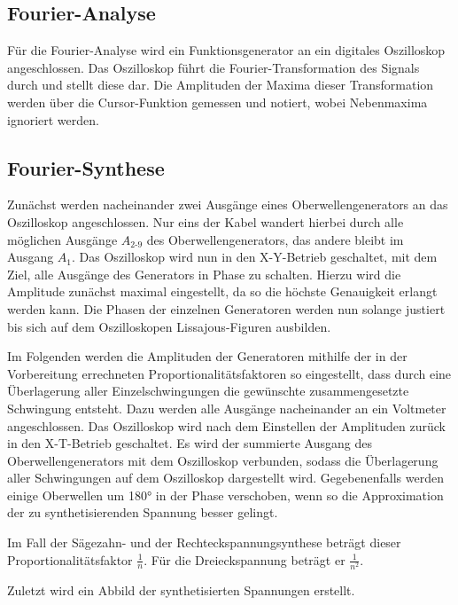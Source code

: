 \subsection{Fourier-Analyse}
Für die Fourier-Analyse wird ein Funktionsgenerator an ein digitales Oszilloskop angeschlossen.
Das Oszilloskop führt die Fourier-Transformation des Signals durch und stellt diese dar.
Die Amplituden der Maxima dieser Transformation werden über die Cursor-Funktion gemessen
und notiert, wobei Nebenmaxima ignoriert werden.

\subsection{Fourier-Synthese}
Zunächst werden nacheinander zwei Ausgänge eines Oberwellengenerators an das Oszilloskop angeschlossen.
Nur eins der Kabel wandert hierbei durch alle möglichen Ausgänge $A_\text{2-9}$ des Oberwellengenerators, das andere bleibt
im Ausgang $A_\text{1}$. Das Oszilloskop wird nun in den X-Y-Betrieb geschaltet, mit dem Ziel,
alle Ausgänge des Generators in Phase zu schalten. Hierzu wird die Amplitude zunächst maximal eingestellt,
da so die höchste Genauigkeit erlangt werden kann. Die Phasen der einzelnen Generatoren werden
nun solange justiert bis sich auf dem Oszilloskopen Lissajous-Figuren ausbilden.

Im Folgenden werden die Amplituden der Generatoren mithilfe der in der Vorbereitung errechneten
Proportionalitätsfaktoren so eingestellt, dass durch eine Überlagerung aller Einzelschwingungen
die gewünschte zusammengesetzte Schwingung entsteht. Dazu werden alle Ausgänge nacheinander
an ein Voltmeter angeschlossen. Das Oszilloskop wird nach dem Einstellen der Amplituden
 zurück in den X-T-Betrieb geschaltet. Es wird der summierte Ausgang des 
Oberwellengenerators mit dem Oszilloskop verbunden, sodass die Überlagerung aller Schwingungen
auf dem Oszilloskop dargestellt wird. Gegebenenfalls werden einige Oberwellen um 180° in der
Phase verschoben, wenn so die Approximation der zu synthetisierenden Spannung besser gelingt.

Im Fall der Sägezahn- und der Rechteckspannungsynthese beträgt dieser Proportionalitätsfaktor 
$\frac{1}{n}$. Für die Dreieckspannung beträgt er $\frac{1}{n^{2}}$.

Zuletzt wird ein Abbild der synthetisierten Spannungen erstellt.